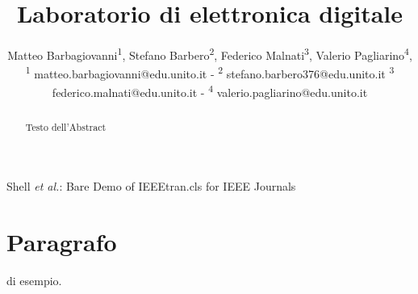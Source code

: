 \documentclass[journal]{IEEEtran}
\begin{document}
\title{Laboratorio di elettronica digitale\\ 
}

\author{\begin{center}Matteo Barbagiovanni\textsuperscript{1},
        Stefano Barbero\textsuperscript{2},
        Federico Malnati\textsuperscript{3},
        Valerio Pagliarino\textsuperscript{4},
        {\small \\
        \textsuperscript{1}
        matteo.barbagiovanni@edu.unito.it -
        \textsuperscript{2}
        stefano.barbero376@edu.unito.it
        \textsuperscript{3}
        federico.malnati@edu.unito.it -
        \textsuperscript{4}
        valerio.pagliarino@edu.unito.it}
        \end{center}}%
        
{Shell \MakeLowercase{\textit{et al.}}: Bare Demo of IEEEtran.cls for IEEE Journals}

\maketitle


\begin{abstract} Testo dell'Abstract
\end{abstract}


\section{Paragrafo}
 di esempio.
\end{document}
